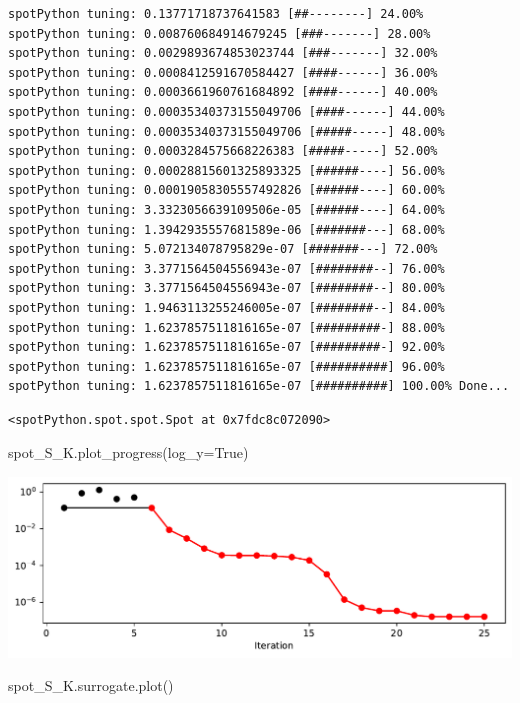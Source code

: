 \documentclass[
  letterpaper,
  DIV=11,
  numbers=noendperiod]{scrreprt}
\newenvironment{Shaded}{\begin{snugshade}}{\end{snugshade}}
\newcommand{\NormalTok}[1]{\textcolor[rgb]{0.00,0.23,0.31}{#1}}
\newcommand{\OperatorTok}[1]{\textcolor[rgb]{0.37,0.37,0.37}{#1}}
\newcommand{\VariableTok}[1]{\textcolor[rgb]{0.07,0.07,0.07}{#1}}
\begin{document}
\begin{verbatim}
spotPython tuning: 0.13771718737641583 [##--------] 24.00% 
spotPython tuning: 0.008760684914679245 [###-------] 28.00% 
spotPython tuning: 0.0029893674853023744 [###-------] 32.00% 
spotPython tuning: 0.0008412591670584427 [####------] 36.00% 
spotPython tuning: 0.0003661960761684892 [####------] 40.00% 
spotPython tuning: 0.00035340373155049706 [####------] 44.00% 
spotPython tuning: 0.00035340373155049706 [#####-----] 48.00% 
spotPython tuning: 0.0003284575668226383 [#####-----] 52.00% 
spotPython tuning: 0.00028815601325893325 [######----] 56.00% 
spotPython tuning: 0.00019058305557492826 [######----] 60.00% 
spotPython tuning: 3.3323056639109506e-05 [######----] 64.00% 
spotPython tuning: 1.3942935557681589e-06 [#######---] 68.00% 
spotPython tuning: 5.072134078795829e-07 [#######---] 72.00% 
spotPython tuning: 3.3771564504556943e-07 [########--] 76.00% 
spotPython tuning: 3.3771564504556943e-07 [########--] 80.00% 
spotPython tuning: 1.9463113255246005e-07 [########--] 84.00% 
spotPython tuning: 1.6237857511816165e-07 [#########-] 88.00% 
spotPython tuning: 1.6237857511816165e-07 [#########-] 92.00% 
spotPython tuning: 1.6237857511816165e-07 [##########] 96.00% 
spotPython tuning: 1.6237857511816165e-07 [##########] 100.00% Done...
\end{verbatim}

\begin{verbatim}
<spotPython.spot.spot.Spot at 0x7fdc8c072090>
\end{verbatim}

\begin{Shaded}
\begin{Highlighting}[]
\NormalTok{spot\_S\_K.plot\_progress(log\_y}\OperatorTok{=}\VariableTok{True}\NormalTok{)}
\end{Highlighting}
\end{Shaded}

\includegraphics{012_num_spot_ei_files/figure-pdf/cell-39-output-1.pdf}

\begin{Shaded}
\begin{Highlighting}[]
\NormalTok{spot\_S\_K.surrogate.plot()}
\end{Highlighting}
\end{Shaded}
\end{document}
